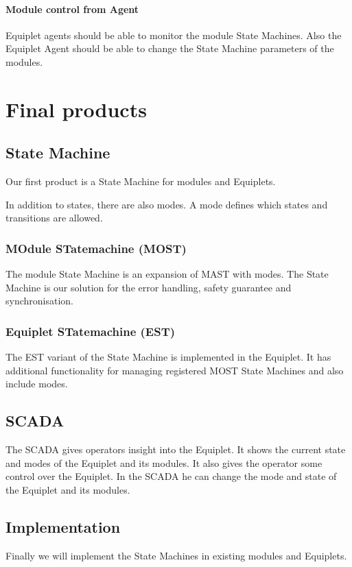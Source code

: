 \documentclass[12pt,a4paper]{report}
\begin{document}
\paragraph{Module control from Agent} Equiplet agents should be able to monitor the module State Machines. Also the Equiplet Agent should be able to change the State Machine parameters of the modules.

\newpage
\section{Final products}
\subsection{State Machine}
Our first product is a State Machine for modules and Equiplets. 

In addition to states, there are also modes.
A mode defines which states and transitions are allowed.

\subsubsection{MOdule STatemachine (MOST)}
The module State Machine is an expansion of MAST with modes.
The State Machine is our solution for the error handling, safety guarantee and synchronisation.

\subsubsection{Equiplet STatemachine (EST)}
The EST variant of the State Machine is implemented in the Equiplet.
It has additional functionality for managing registered MOST State Machines and also include modes.

\subsection{SCADA}
The SCADA gives operators insight into the Equiplet.
It shows the current state and modes of the Equiplet and its modules.
It also gives the operator some control over the Equiplet.
In the SCADA he can change the mode and state of the Equiplet and its modules.

\subsection{Implementation}
Finally we will implement the State Machines in existing modules and Equiplets.
\end{document}
